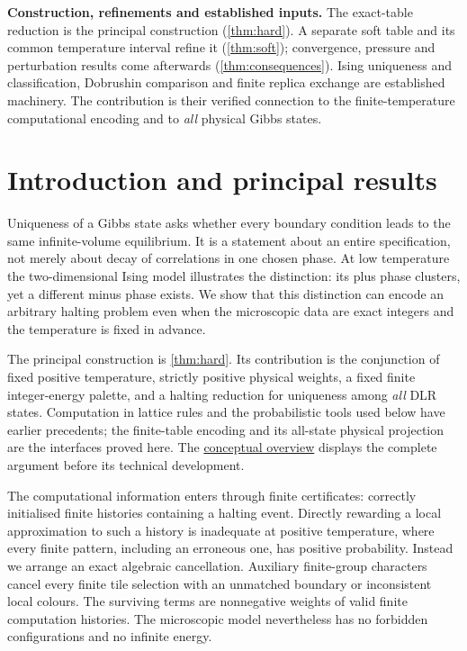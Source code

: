 \documentclass[11pt,reqno]{amsart}
\numberwithin{equation}{section}
\theoremstyle{definition}
\theoremstyle{remark}
\begin{document}
\smallskip
\noindent\textbf{Construction, refinements and established inputs.}
The exact-table reduction is the principal construction (\cref{thm:hard}). A separate soft table and its common temperature interval refine it (\cref{thm:soft}); convergence, pressure and perturbation results come afterwards (\cref{thm:consequences}). Ising uniqueness and classification, Dobrushin comparison and finite replica exchange are established machinery. The contribution is their verified connection to the finite-temperature computational encoding and to \emph{all} physical Gibbs states.

\clearpage

\section{Introduction and principal results}\label{sec:intro}

Uniqueness of a Gibbs state asks whether every boundary condition leads to the same infinite-volume equilibrium. It is a statement about an entire specification, not merely about decay of correlations in one chosen phase. At low temperature the two-dimensional Ising model illustrates the distinction: its plus phase clusters, yet a different minus phase exists. We show that this distinction can encode an arbitrary halting problem even when the microscopic data are exact integers and the temperature is fixed in advance.

The principal construction is \cref{thm:hard}. Its contribution is the conjunction of fixed positive temperature, strictly positive physical weights, a fixed finite integer-energy palette, and a halting reduction for uniqueness among \emph{all} DLR states. Computation in lattice rules and the probabilistic tools used below have earlier precedents; the finite-table encoding and its all-state physical projection are the interfaces proved here. The \hyperref[sec:overview]{conceptual overview} displays the complete argument before its technical development.

The computational information enters through finite certificates: correctly initialised finite histories containing a halting event. Directly rewarding a local approximation to such a history is inadequate at positive temperature, where every finite pattern, including an erroneous one, has positive probability. Instead we arrange an exact algebraic cancellation. Auxiliary finite-group characters cancel every finite tile selection with an unmatched boundary or inconsistent local colours. The surviving terms are nonnegative weights of valid finite computation histories. The microscopic model nevertheless has no forbidden configurations and no infinite energy.
\end{document}
